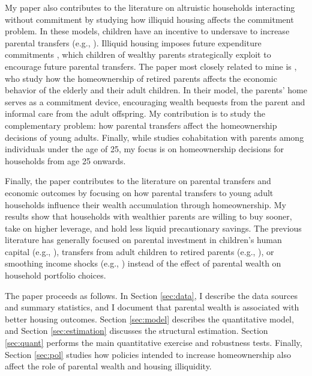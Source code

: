 \documentclass[12pt]{article}
\begin{document}
My paper also contributes to the literature on altruistic households interacting without commitment by studying how illiquid housing affects the commitment problem. In these models, children have an incentive to undersave to increase parental transfers (e.g., \citealp{Altonji1997a,Boar2018,Barczyk2014,Chu2020}). Illiquid housing imposes future expenditure commitments \citep{Chetty2007,Shore2010}, which children of wealthy parents strategically exploit to encourage future parental transfers. The paper most closely related to mine is \cite{Barczyk2020a}, who study how the homeownership of retired parents affects the economic behavior of the elderly and their adult children. In their model, the parents' home serves as a commitment device, encouraging wealth bequests from the parent and informal care from the adult offspring. My contribution is to study the complementary problem: how parental transfers affect the homeownership decisions of young adults. Finally, while \cite{kaplan2012moving} studies cohabitation with parents among individuals under the age of 25, my focus is on homeownership decisions for households from age 25 onwards.

Finally, the paper contributes to the literature on parental transfers and economic outcomes by focusing on how parental transfers to young adult households influence their wealth accumulation through homeownership. My results show that households with wealthier parents are willing to buy sooner, take on higher leverage, and hold less liquid precautionary savings. The previous literature has generally focused on parental investment in children's human capital (e.g., \citealp{Lee2019,Daruich2018,gilraine2023public}), transfers from adult children to retired parents (e.g., \citealp{Mommaerts2016, Barczyk2018, Barczyk2020a}), or smoothing income shocks (e.g., \cite{Boar2021ReStud,fagereng2023insuring,andersen2020bailing}) instead of the effect of parental wealth on household portfolio choices.

The paper proceeds as follows. In Section \ref{sec:data}, I describe the data sources and summary statistics, and I document that parental wealth is associated with better housing outcomes. Section \ref{sec:model} describes the quantitative model, and Section \ref{sec:estimation} discusses the structural estimation. Section \ref{sec:quant} performs the main quantitative exercise and robustness tests. Finally, Section \ref{sec:pol} studies how policies intended to increase homeownership also affect the role of parental wealth and housing illiquidity.
\end{document}
